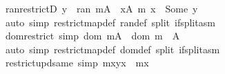 \begin{isabellebody}
%
\endisadelimproof
\isanewline
{}\isamarkupfalse%
\ ran{\isacharunderscore}{\kern0pt}restrictD{\isacharcolon}{\kern0pt}\ {\isachardoublequoteopen}y\ {\isasymin}\ ran\ {\isacharparenleft}{\kern0pt}m{\isacharbar}{\kern0pt}{\isacharbackquote}{\kern0pt}A{\isacharparenright}{\kern0pt}\ {\isasymLongrightarrow}\ {\isasymexists}x{\isasymin}A{\isachardot}{\kern0pt}\ m\ x\ {\isacharequal}{\kern0pt}\ Some\ y{\isachardoublequoteclose}\isanewline
%
\isadelimproof
\ \ %
\endisadelimproof
%
\isatagproof
{}\isamarkupfalse%
\ {\isacharparenleft}{\kern0pt}auto\ simp{\isacharcolon}{\kern0pt}\ restrict{\isacharunderscore}{\kern0pt}map{\isacharunderscore}{\kern0pt}def\ ran{\isacharunderscore}{\kern0pt}def\ split{\isacharcolon}{\kern0pt}\ if{\isacharunderscore}{\kern0pt}split{\isacharunderscore}{\kern0pt}asm{\isacharparenright}{\kern0pt}%
\endisatagproof
{\isafoldproof}%
%
\isadelimproof
\isanewline
%
\endisadelimproof
\isanewline
{}\isamarkupfalse%
\ dom{\isacharunderscore}{\kern0pt}restrict\ {\isacharbrackleft}{\kern0pt}simp{\isacharbrackright}{\kern0pt}{\isacharcolon}{\kern0pt}\ {\isachardoublequoteopen}dom\ {\isacharparenleft}{\kern0pt}m{\isacharbar}{\kern0pt}{\isacharbackquote}{\kern0pt}A{\isacharparenright}{\kern0pt}\ {\isacharequal}{\kern0pt}\ dom\ m\ {\isasyminter}\ A{\isachardoublequoteclose}\isanewline
%
\isadelimproof
\ \ %
\endisadelimproof
%
\isatagproof
{}\isamarkupfalse%
\ {\isacharparenleft}{\kern0pt}auto\ simp{\isacharcolon}{\kern0pt}\ restrict{\isacharunderscore}{\kern0pt}map{\isacharunderscore}{\kern0pt}def\ dom{\isacharunderscore}{\kern0pt}def\ split{\isacharcolon}{\kern0pt}\ if{\isacharunderscore}{\kern0pt}split{\isacharunderscore}{\kern0pt}asm{\isacharparenright}{\kern0pt}%
\endisatagproof
{\isafoldproof}%
%
\isadelimproof
\isanewline
%
\endisadelimproof
\isanewline
{}\isamarkupfalse%
\ restrict{\isacharunderscore}{\kern0pt}upd{\isacharunderscore}{\kern0pt}same\ {\isacharbrackleft}{\kern0pt}simp{\isacharbrackright}{\kern0pt}{\isacharcolon}{\kern0pt}\ {\isachardoublequoteopen}m{\isacharparenleft}{\kern0pt}x{\isasymmapsto}y{\isacharparenright}{\kern0pt}{\isacharbar}{\kern0pt}{\isacharbackquote}{\kern0pt}{\isacharparenleft}{\kern0pt}{\isacharminus}{\kern0pt}{\isacharbraceleft}{\kern0pt}x{\isacharbraceright}{\kern0pt}{\isacharparenright}{\kern0pt}\ {\isacharequal}{\kern0pt}\ m{\isacharbar}{\kern0pt}{\isacharbackquote}{\kern0pt}{\isacharparenleft}{\kern0pt}{\isacharminus}{\kern0pt}{\isacharbraceleft}{\kern0pt}x{\isacharbraceright}{\kern0pt}{\isacharparenright}{\kern0pt}{\isachardoublequoteclose}\isanewline

\end{isabellebody}
